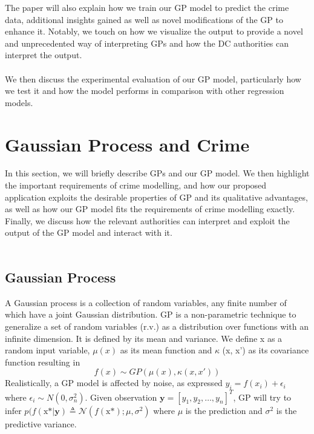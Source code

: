 \documentclass[letterpaper]{article}
\begin{document}
	The paper will also explain how we train our GP model to predict the crime data, additional insights gained as well as novel modifications of the GP to enhance it. 
	Notably, we touch on how we visualize the output to provide a novel and unprecedented way of interpreting GPs and how the DC authorities can interpret the output.\\ \\

	We then discuss the experimental evaluation of our GP model, particularly how we test it and how the model performs in comparison with other regression models. 
	
	\section{Gaussian Process and Crime}

	In this section, we will briefly describe GPs and our GP model. We then highlight the important requirements of crime modelling, and how our proposed application exploits the desirable properties of GP and its qualitative advantages, as well as how our GP model fits the requirements of crime modelling exactly. 
	Finally, we discuss how the relevant authorities can interpret and exploit the output of the GP model and interact with it.\\ \\

	\subsection{Gaussian Process}
	
	A Gaussian process is a collection of random variables, any finite number of which have a joint Gaussian distribution.
	GP is a non-parametric technique to generalize a set of random variables (r.v.) as a distribution over functions with an infinite dimension. \autocite{c01}
	It is defined by its mean and variance. We define x as a random input variable, $\mu (x)$ as its mean function and $\kappa$ (x, x') as its covariance function resulting in \[f(x) \sim GP(\mu (x), \kappa (x, x')) \]
	Realistically, a GP model is affected by noise, as expressed $y_i = f(x_i) + \epsilon_i$ where $\epsilon_i \sim N(0, \sigma^2_n)$.
	Given observation $\mathbf{y} = [y_1, y_2, \ldots, y_n]^T$, GP will try to infer  $ p(f(\text{x*} | \textbf{y}) \triangleq \mathcal{N}(f(\text{x*}); \mu, \sigma^2)$ where $\mu$ is the prediction and $\sigma^2$ is the predictive variance. 
	
\end{document}
